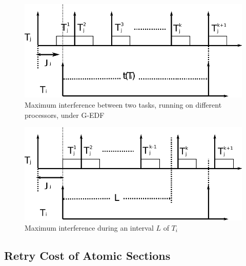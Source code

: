 \documentclass[letter]{sig-alternate}
\begin{document}
\begin{figure}%
\centering
\includegraphics[bb=0bp 0bp 542bp 162bp,scale=0.5]{figures/figure9-a}
\caption{\label{fig1} Maximum interference between two tasks, running on different processors, under G-EDF}
\end{figure}


\begin{figure}
\centering
\includegraphics[bb=0bp 0bp 542bp 162bp,scale=0.5]{figures/figure9-b}
\caption{\label{fig2}Maximum interference during an interval $L$ of $T_{i}$}
\end{figure}



\subsection{Retry Cost of Atomic Sections}
\end{document}
